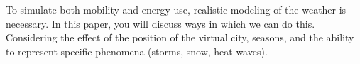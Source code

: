 To simulate both mobility and energy use, realistic modeling of the weather is necessary.
In this paper, you will discuss ways in which we can do this.
Considering the effect of the position of the virtual city, seasons, and the ability to represent specific phenomena (storms, snow, heat waves).